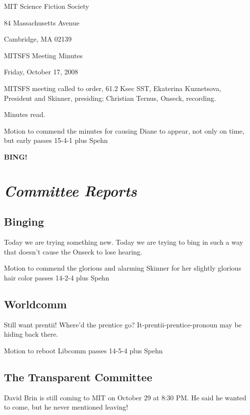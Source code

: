 \documentclass[10pt]{article}
\newcommand{\bing}{{\bf BING!} }
\newcommand{\goto}[1]{\bing \vskip 12pt \section*{{\em{#1}}}}
\newcommand{\ps}{ plus Spehn\xspace}
\begin{document}
\begin{center}

MIT Science Fiction Society

84 Massachusetts Avenue

Cambridge, MA 02139

\vspace{12pt}

MITSFS Meeting Minutes

Friday, October 17, 2008

\end{center}

\vspace{18pt}

\setlength{\parskip}{6pt}

\noindent
MITSFS meeting called to order, 61.2 Ksec SST,
Ekaterina Kuznetsova, President and Skinner, presiding; Christian Ternus, Onseck, recording.

Minutes read.

Motion to commend the minutes for causing Diane to appear, not only on time, but early passes 15-4-1 \ps

\BING

\goto{Committee Reports}

\subsection*{Binging}

Today we are trying something new.  Today we are trying to bing in
such a way that doesn't cause the Onseck to lose hearing.

Motion to commend the glorious and alarming Skinner for her slightly glorious hair color passes 14-2-4 \ps

\subsection*{Worldcomm}

Still want prentii!  Where'd the prentice go?  It-prentii-prentice-pronoun may be hiding back there.

Motion to reboot Libcomm passes 14-5-4 \ps

\subsection*{The Transparent Committee}

David Brin is still coming to MIT on October 29 at 8:30 PM.  He said
he wanted to come, but he never mentioned leaving!
\end{document}
